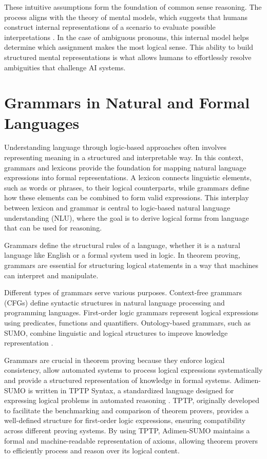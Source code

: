 \documentclass[english,version-2020-11]{uzl-thesis}
\begin{document}
These intuitive assumptions form the foundation of common sense reasoning. The process aligns with the theory of mental models, which suggests that humans construct internal representations of a scenario to evaluate possible interpretations \cite{JohnsonLaird1989}. In the case of ambiguous pronouns, this internal model helps determine which assignment makes the most logical sense. This ability to build structured mental representations is what allows humans to effortlessly resolve ambiguities that challenge AI systems.

\section{Grammars in Natural and Formal Languages}

Understanding language through logic-based approaches often involves representing meaning in a structured and interpretable way. In this context, grammars and lexicons provide the foundation for mapping natural language expressions into formal representations. A lexicon connects linguistic elements, such as words or phrases, to their logical counterparts, while grammars define how these elements can be combined to form valid expressions. This interplay between lexicon and grammar is central to logic-based natural language understanding (NLU), where the goal is to derive logical forms from language that can be used for reasoning.

Grammars define the structural rules of a language, whether it is a natural language like English or a formal system used in logic. In theorem proving, grammars are essential for structuring logical statements in a way that machines can interpret and manipulate.

Different types of grammars serve various purposes. Context-free grammars (CFGs) define syntactic structures in natural language processing and programming languages. First-order logic grammars represent logical expressions using predicates, functions and quantifiers. Ontology-based grammars, such as SUMO, combine linguistic and logical structures to improve knowledge representation \cite{Niles2001}.

Grammars are crucial in theorem proving because they enforce logical consistency, allow automated systems to process logical expressions systematically and provide a structured representation of knowledge in formal systems. Adimen-SUMO is written in TPTP Syntax, a standardized language designed for expressing logical problems in automated reasoning \cite{Alvez2014}. TPTP, originally developed to facilitate the benchmarking and comparison of theorem provers, provides a well-defined structure for first-order logic expressions, ensuring compatibility across different proving systems. By using TPTP, Adimen-SUMO maintains a formal and machine-readable representation of axioms, allowing theorem provers to efficiently process and reason over its logical content.
\end{document}
